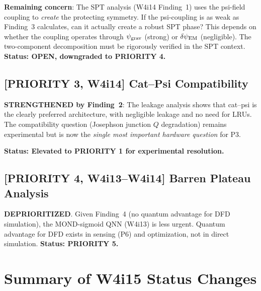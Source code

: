 \documentclass[11pt]{article}
\theoremstyle{definition}
\theoremstyle{remark}
\newcommand{\psigrav}{\psi_{\rm grav}}
\newcommand{\dpsiEM}{\delta\psi_{\rm EM}}
\begin{document}
\textbf{Remaining concern}: The SPT analysis (W4i14 Finding~1) uses the
psi-field coupling to \emph{create} the protecting symmetry.  If the
psi-coupling is as weak as Finding~3 calculates, can it actually create
a robust SPT phase?  This depends on whether the coupling operates
through $\psigrav$ (strong) or $\dpsiEM$ (negligible).  The two-component
decomposition must be rigorously verified in the SPT context.
\textbf{Status: OPEN, downgraded to PRIORITY 4.}

\subsection{[PRIORITY 3, W4i14] Cat--Psi Compatibility}

\textbf{STRENGTHENED by Finding~2}: The leakage analysis shows that
cat--psi is the clearly preferred architecture, with negligible leakage
and no need for LRUs.  The compatibility question (Josephson junction
$Q$ degradation) remains experimental but is now the \emph{single most
important hardware question} for P3.

\textbf{Status: Elevated to PRIORITY 1 for experimental resolution.}

\subsection{[PRIORITY 4, W4i13--W4i14] Barren Plateau Analysis}

\textbf{DEPRIORITIZED}.  Given Finding~4 (no quantum advantage for DFD
simulation), the MOND-sigmoid QNN (W4i13) is less urgent.  Quantum
advantage for DFD exists in sensing (P6) and optimization, not in
direct simulation.  \textbf{Status: PRIORITY 5.}

\section{Summary of W4i15 Status Changes}
\label{sec:status-changes}
\end{document}
